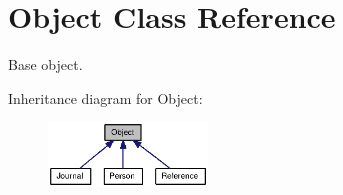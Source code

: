 \hypertarget{class_object}{
\section{Object Class Reference}
\label{class_object}
}
Base object.  


Inheritance diagram for Object:\nopagebreak
\begin{figure}[H]
\begin{center}
\leavevmode
\includegraphics[width=120pt]{class_object__inherit__graph}
\end{center}
\end{figure}
